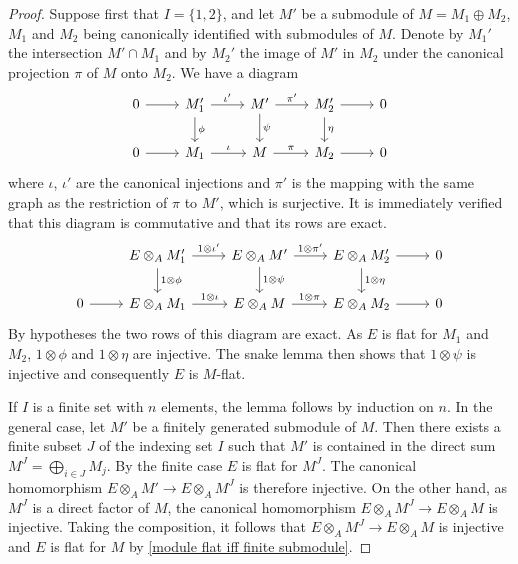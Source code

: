 \begin{proof}
Suppose first that $I=\{1,2\}$, and let $M'$ be a submodule of $M=M_1\oplus M_2$, $M_1$ and $M_2$ being canonically identified with submodules of $M$. Denote by $M_1'$ the intersection $M'\cap M_1$ and by $M_2'$ the image of $M'$ in $M_2$ under the canonical projection $\pi$ of $M$ onto $M_2$. We have a diagram
\[\begin{tikzcd}
0\ar[r]&M_1'\ar[r,"\iota'"]\ar[d,"\phi"]&M'\ar[r,"\pi'"]\ar[d,"\psi"]&M_2'\ar[r]\ar[d,"\eta"]&0\\
0\ar[r]&M_1\ar[r,"\iota"]&M\ar[r,"\pi"]&M_2\ar[r]&0
\end{tikzcd}\]
where $\iota$, $\iota'$ are the canonical injections and $\pi'$ is the mapping with the same graph as the restriction of $\pi$ to $M'$, which is surjective. It is immediately verified that this diagram is commutative and that its rows are exact.
\[\begin{tikzcd}
&E\otimes_AM_1'\ar[r,"1\otimes\iota'"]\ar[d,"1\otimes\phi"]&E\otimes_AM'\ar[r,"1\otimes\pi'"]\ar[d,"1\otimes\psi"]&E\otimes_AM_2'\ar[r]\ar[d,"1\otimes\eta"]&0\\
0\ar[r]&E\otimes_AM_1\ar[r,"1\otimes\iota"]&E\otimes_AM\ar[r,"1\otimes\pi"]&E\otimes_AM_2\ar[r]&0
\end{tikzcd}\]
By hypotheses the two rows of this diagram are exact. As $E$ is flat for $M_1$ and $M_2$, $1\otimes\phi$ and $1\otimes\eta$ are injective. The snake lemma then shows that $1\otimes\psi$ is injective and consequently $E$ is $M$-flat.\par
If $I$ is a finite set with $n$ elements, the lemma follows by induction on $n$. In the general case, let $M'$ be a finitely generated submodule of $M$. Then there exists a finite subset $J$ of the indexing set $I$ such that $M'$ is contained in the direct sum $M^J=\bigoplus_{i\in J}M_j$. By the finite case $E$ is flat for $M^J$. The canonical homomorphism $E\otimes_AM'\to E\otimes_AM^J$ is therefore injective. On the other hand, as $M^J$ is a direct factor of $M$, the canonical homomorphism $E\otimes_AM^J\to E\otimes_AM$ is injective. Taking the composition, it follows that $E\otimes_AM^J\to E\otimes_AM$ is injective and $E$ is flat for $M$ by \cref{module flat iff finite submodule}.
\end{proof}

